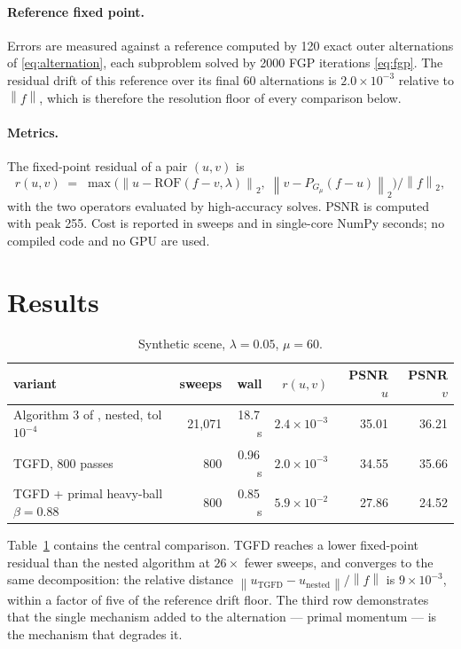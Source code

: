 \documentclass[11pt]{article}
\theoremstyle{definition}
\newcommand{\norm}[1]{\left\lVert #1 \right\rVert}
\newcommand{\ROF}{\mathrm{ROF}}
\newcommand{\PG}{P_{G_\mu}}
\begin{document}
\paragraph{Reference fixed point.}
Errors are measured against a reference computed by 120 exact outer
alternations of \eqref{eq:alternation}, each subproblem solved by 2000 FGP
iterations \eqref{eq:fgp}. The residual drift of this reference over its
final 60 alternations is $2.0\times10^{-3}$ relative to $\norm{f}$, which
is therefore the resolution floor of every comparison below.

\paragraph{Metrics.}
The fixed-point residual of a pair $(u,v)$ is
\[
r(u,v)\;=\;\max\bigl(\norm{u-\ROF(f-v,\lambda)}_2,\;
\norm{v-\PG(f-u)}_2\bigr)\big/\norm{f}_2,
\]
with the two operators evaluated by high-accuracy solves. PSNR is computed
with peak 255. Cost is reported in sweeps and in single-core NumPy seconds;
no compiled code and no GPU are used.

\section{Results}
\label{sec:results}

\begin{table}[t]
\centering
\caption{Synthetic scene, $\lambda=0.05$, $\mu=60$.}
\label{tab:iters}
\begin{tabular}{lrrrrr}
\toprule
variant & sweeps & wall & $r(u,v)$ & PSNR $u$ & PSNR $v$\\
\midrule
Algorithm 3 of \cite{gilles}, nested, tol $10^{-4}$ & 21{,}071 & 18.7\,s & $2.4\times10^{-3}$ & 35.01 & 36.21\\
TGFD, 800 passes & 800 & 0.96\,s & $2.0\times10^{-3}$ & 34.55 & 35.66\\
TGFD + primal heavy-ball $\beta=0.88$ & 800 & 0.85\,s & $5.9\times10^{-2}$ & 27.86 & 24.52\\
\bottomrule
\end{tabular}
\end{table}

Table~\ref{tab:iters} contains the central comparison. TGFD reaches a lower
fixed-point residual than the nested algorithm at $26\times$ fewer sweeps,
and converges to the same decomposition: the relative distance
$\norm{u_{\mathrm{TGFD}}-u_{\mathrm{nested}}}/\norm{f}$ is
$9\times10^{-3}$, within a factor of five of the reference drift floor. The third row
demonstrates that the single mechanism added to the alternation --- primal
momentum --- is the mechanism that degrades it.
\end{document}
